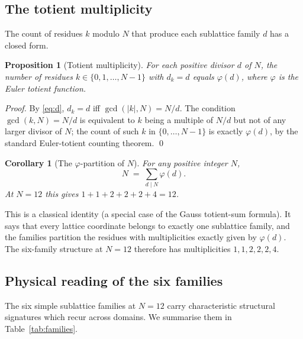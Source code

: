 \documentclass[11pt,a4paper]{article}
\newtheorem{corollary}[theorem]{Corollary}
\newtheorem{proposition}[theorem]{Proposition}
\theoremstyle{definition}
\theoremstyle{remark}
\begin{document}
\subsection{The totient multiplicity}

The count of residues $k$ modulo $N$ that produce each sublattice family $d$ has a closed form.

\begin{proposition}[Totient multiplicity]\label{prop:totient}
For each positive divisor $d$ of $N$, the number of residues $k\in\{0,1,\ldots,N-1\}$ with $d_{k}=d$ equals $\varphi(d)$, where $\varphi$ is the Euler totient function.
\end{proposition}

\begin{proof}
By \eqref{eq:d}, $d_{k}=d$ iff $\gcd(|k|,N)=N/d$. The condition $\gcd(k,N)=N/d$ is equivalent to $k$ being a multiple of $N/d$ but not of any larger divisor of $N$; the count of such $k$ in $\{0,\ldots,N-1\}$ is exactly $\varphi(d)$, by the standard Euler-totient counting theorem. \qed
\end{proof}

\begin{corollary}[The $\varphi$-partition of $N$]\label{cor:totientpartition}
For any positive integer $N$,
\[
N \;=\; \sum_{d\mid N}\varphi(d).
\]
At $N=12$ this gives $1+1+2+2+2+4=12$.
\end{corollary}

This is a classical identity (a special case of the Gauss totient-sum formula). It says that every lattice coordinate belongs to exactly one sublattice family, and the families partition the residues with multiplicities exactly given by $\varphi(d)$. The six-family structure at $N=12$ therefore has multiplicities $1,1,2,2,2,4$.

\subsection{Physical reading of the six families}

The six simple sublattice families at $N=12$ carry characteristic structural signatures which recur across domains. We summarise them in Table~\ref{tab:families}.
\end{document}
